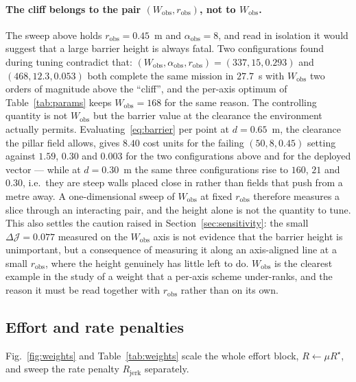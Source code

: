 \documentclass[11pt,a4paper]{article}
\newcommand{\Wobs}{W_{\mathrm{obs}}}
\newcommand{\aobs}{\alpha_{\mathrm{obs}}}
\newcommand{\robs}{r_{\mathrm{obs}}}
\newcommand{\Rjerk}{R_{\mathrm{jerk}}}
\begin{document}
\paragraph{The cliff belongs to the pair $(\Wobs,\robs)$, not to $\Wobs$.} The sweep above holds
$\robs=0.45$~m and $\aobs=8$, and read in isolation it would suggest that a large barrier height is always
fatal. Two configurations found during tuning contradict that: $(\Wobs,\aobs,\robs)=(337,15,0.293)$ and
$(468,12.3,0.053)$ both complete the same mission in $27.7$~s with $\Wobs$ two orders of magnitude above the
``cliff'', and the per-axis optimum of Table~\ref{tab:params} keeps $\Wobs=168$ for the same reason. The controlling quantity is not $\Wobs$ but the barrier
value at the clearance the environment actually permits. Evaluating~\eqref{eq:barrier} per point at
$d=0.65$~m, the clearance the pillar field allows, gives $8.40$ cost units for the failing
$(50,8,0.45)$ setting against $1.59$, $0.30$ and $0.003$ for the two configurations above and for the
deployed vector --- while at $d=0.30$~m the same three configurations rise to $160$, $21$ and $0.30$, i.e.\ they are
steep walls placed close in rather than fields that push from a metre away. A one-dimensional sweep of
$\Wobs$ at fixed $\robs$ therefore measures a slice through an interacting pair, and the height alone is not
the quantity to tune. This also settles the caution raised in Section~\ref{sec:sensitivity}: the small
$\Delta\mathcal{J}=0.077$ measured on the $\Wobs$ axis is not evidence that the barrier height is
unimportant, but a consequence of measuring it along an axis-aligned line at a small $\robs$, where the height
genuinely has little left to do. $\Wobs$ is the clearest example in the study of a weight that a per-axis
scheme under-ranks, and the reason it must be read together with $\robs$ rather than on its own.

\subsection{Effort and rate penalties}
\label{sec:weights}

Fig.~\ref{fig:weights} and Table~\ref{tab:weights} scale the whole effort block, $R\leftarrow\mu R^\star$,
and sweep the rate penalty $\Rjerk$ separately.
\end{document}
